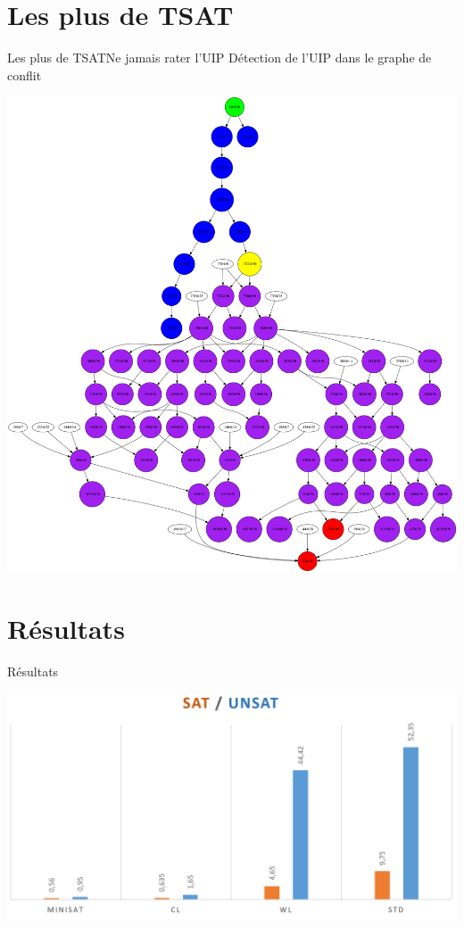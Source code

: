 \documentclass{beamer}
\begin{document}
    \section{Les plus de TSAT}
        \begin{frame}{Les plus de TSAT}{Ne jamais rater l'UIP}
            Détection de l'UIP dans le graphe de conflit 
            \begin{center}
                \includegraphics[scale=0.07]{graphe.png}
            \end{center}
        \end{frame}

    \section{Résultats}
        \begin{frame}{Résultats}{}
            \begin{center}
                \includegraphics[scale=0.25]{time.png}
            \end{center}
        \end{frame}       
\end{document}
